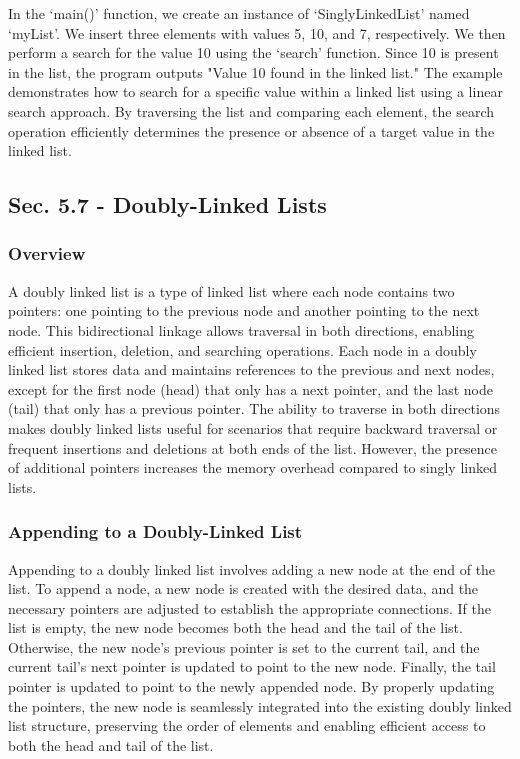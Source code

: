 \begin{solution}
    In the `main()' function, we create an instance of `SinglyLinkedList' named `myList'. We insert three elements with values 5, 10, and 7, respectively. We then perform a search for the value 10 using the `search' function. Since 10 is present in the list, the program outputs "Value 10 found 
    in the linked list." The example demonstrates how to search for a specific value within a linked list using a linear search approach. By traversing the list and comparing each element, the search operation efficiently determines the presence or absence of a target value in the linked list.
\end{solution}

\subsection*{Sec. 5.7 - Doubly-Linked Lists}

\subsubsection{Overview}

A doubly linked list is a type of linked list where each node contains two pointers: one pointing to the previous node and another pointing to the next node. This bidirectional linkage allows traversal in both directions, enabling efficient insertion, deletion, and searching operations. Each node 
in a doubly linked list stores data and maintains references to the previous and next nodes, except for the first node (head) that only has a next pointer, and the last node (tail) that only has a previous pointer. The ability to traverse in both directions makes doubly linked lists useful for 
scenarios that require backward traversal or frequent insertions and deletions at both ends of the list. However, the presence of additional pointers increases the memory overhead compared to singly linked lists.

\subsubsection{Appending to a Doubly-Linked List}

Appending to a doubly linked list involves adding a new node at the end of the list. To append a node, a new node is created with the desired data, and the necessary pointers are adjusted to establish the appropriate connections. If the list is empty, the new node becomes both the head and the tail 
of the list. Otherwise, the new node's previous pointer is set to the current tail, and the current tail's next pointer is updated to point to the new node. Finally, the tail pointer is updated to point to the newly appended node. By properly updating the pointers, the new node is seamlessly integrated 
into the existing doubly linked list structure, preserving the order of elements and enabling efficient access to both the head and tail of the list.

